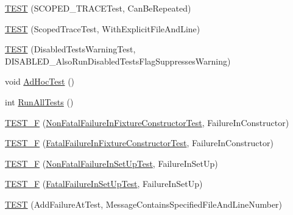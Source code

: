 \begin{DoxyCompactItemize}
\item 
\mbox{\hyperlink{googletest-master_2googletest_2test_2googletest-output-test___8cc_a49c4610eeb41adaa369f9dce003d5198}{T\+E\+ST}} (S\+C\+O\+P\+E\+D\+\_\+\+T\+R\+A\+C\+E\+Test, Can\+Be\+Repeated)
\item 
\mbox{\hyperlink{googletest-master_2googletest_2test_2googletest-output-test___8cc_aff587c2c7d3e81f4d94425987ca07bc1}{T\+E\+ST}} (Scoped\+Trace\+Test, With\+Explicit\+File\+And\+Line)
\item 
\mbox{\hyperlink{googletest-master_2googletest_2test_2googletest-output-test___8cc_a2bdac0e0076d65fa77a967c0fdb46e2a}{T\+E\+ST}} (Disabled\+Tests\+Warning\+Test, D\+I\+S\+A\+B\+L\+E\+D\+\_\+\+Also\+Run\+Disabled\+Tests\+Flag\+Suppresses\+Warning)
\item 
void \mbox{\hyperlink{googletest-master_2googletest_2test_2googletest-output-test___8cc_a36cd4d21174efaa3066237d716028d49}{Ad\+Hoc\+Test}} ()
\item 
int \mbox{\hyperlink{googletest-master_2googletest_2test_2googletest-output-test___8cc_ae0ca194f6b730e168850ce3179ad4f63}{Run\+All\+Tests}} ()
\item 
\mbox{\hyperlink{googletest-master_2googletest_2test_2googletest-output-test___8cc_ad122def39d78da61690433e185611737}{T\+E\+S\+T\+\_\+F}} (\mbox{\hyperlink{class_non_fatal_failure_in_fixture_constructor_test}{Non\+Fatal\+Failure\+In\+Fixture\+Constructor\+Test}}, Failure\+In\+Constructor)
\item 
\mbox{\hyperlink{googletest-master_2googletest_2test_2googletest-output-test___8cc_a858b341fa0b2298c1534b1325fedf797}{T\+E\+S\+T\+\_\+F}} (\mbox{\hyperlink{class_fatal_failure_in_fixture_constructor_test}{Fatal\+Failure\+In\+Fixture\+Constructor\+Test}}, Failure\+In\+Constructor)
\item 
\mbox{\hyperlink{googletest-master_2googletest_2test_2googletest-output-test___8cc_aaa9d6fcc5d9910aedb42ff3db3cc313c}{T\+E\+S\+T\+\_\+F}} (\mbox{\hyperlink{class_non_fatal_failure_in_set_up_test}{Non\+Fatal\+Failure\+In\+Set\+Up\+Test}}, Failure\+In\+Set\+Up)
\item 
\mbox{\hyperlink{googletest-master_2googletest_2test_2googletest-output-test___8cc_a52057afc95d69adbae1fbe0ef92b29d7}{T\+E\+S\+T\+\_\+F}} (\mbox{\hyperlink{class_fatal_failure_in_set_up_test}{Fatal\+Failure\+In\+Set\+Up\+Test}}, Failure\+In\+Set\+Up)
\item 
\mbox{\hyperlink{googletest-master_2googletest_2test_2googletest-output-test___8cc_a62631ea26f8f98f3f19dc03f950dc197}{T\+E\+ST}} (Add\+Failure\+At\+Test, Message\+Contains\+Specified\+File\+And\+Line\+Number)

\end{DoxyCompactItemize}
